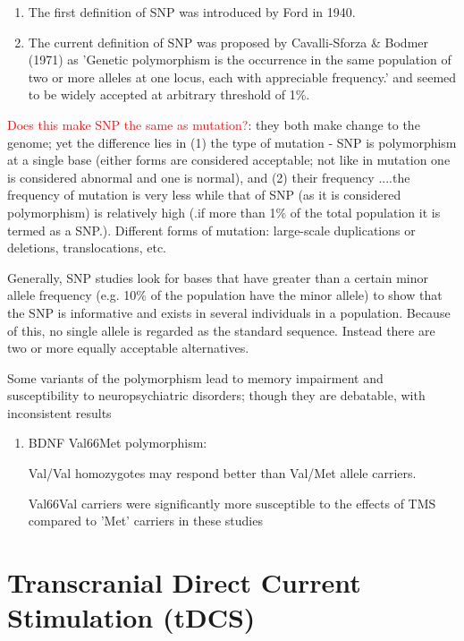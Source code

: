 \begin{enumerate}
  \item The first definition of SNP was introduced by  Ford in 1940.

  \item The current definition of SNP was  proposed by Cavalli-Sforza \& Bodmer
  (1971) as 'Genetic polymorphism is the occurrence in the same population of
  two or more alleles at one locus, each with appreciable frequency.' and seemed
  to be widely accepted at arbitrary threshold of 1\%.

\end{enumerate}

\textcolor{red}{Does this make SNP the same as mutation?}: they both make change
to the genome; yet the difference lies in (1) the type of mutation - SNP is
polymorphism at a single base (either forms are considered acceptable; not like
in mutation one is considered abnormal and one is normal), and (2) their
frequency ....the frequency of mutation is very less while that of SNP (as it is
considered polymorphism) is relatively high (.if more than 1\% of the total
population it is termed as a SNP.). Different forms of mutation: large-scale
duplications or deletions, translocations, etc.

Generally, SNP studies look for bases that have greater than a certain minor
allele frequency (e.g. 10\% of the population have the minor allele) to show
that the SNP is informative and exists in several individuals in a population.
Because of this, no single allele is regarded as the standard sequence. Instead
there are two or more equally acceptable alternatives.


Some variants of the polymorphism lead to memory impairment and susceptibility
to neuropsychiatric disorders; though they are debatable, with inconsistent
results 
\begin{enumerate}
  \item BDNF Val66Met polymorphism: 
  
  Val/Val homozygotes may respond better than Val/Met allele carriers.
  
  Val66Val carriers were significantly more susceptible to the effects of TMS
  compared to 'Met' carriers in these studies

   
\end{enumerate}



\chapter{Transcranial Direct Current Stimulation (tDCS) }
\label{sec:tDCs}

